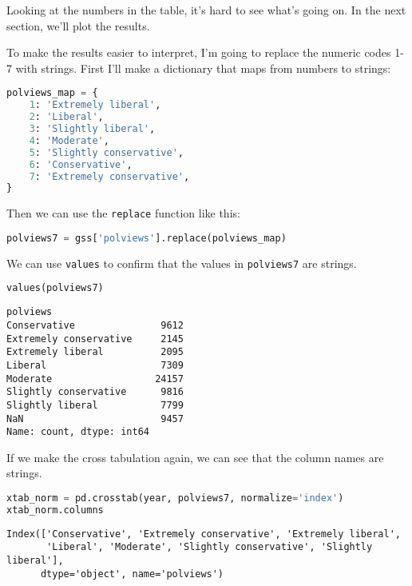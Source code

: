 Looking at the numbers in the table, it's hard to see what's going on.
In the next section, we'll plot the results.

To make the results easier to interpret, I'm going to replace the
numeric codes 1-7 with strings. First I'll make a dictionary that maps
from numbers to strings:

\begin{lstlisting}[language=Python,style=source]
polviews_map = {
    1: 'Extremely liberal',
    2: 'Liberal',
    3: 'Slightly liberal',
    4: 'Moderate',
    5: 'Slightly conservative',
    6: 'Conservative',
    7: 'Extremely conservative',
}
\end{lstlisting}

Then we can use the \passthrough{\lstinline!replace!} function like
this:

\begin{lstlisting}[language=Python,style=source]
polviews7 = gss['polviews'].replace(polviews_map)
\end{lstlisting}

We can use \passthrough{\lstinline!values!} to confirm that the values
in \passthrough{\lstinline!polviews7!} are strings.

\begin{lstlisting}[language=Python,style=source]
values(polviews7)
\end{lstlisting}

\begin{lstlisting}[style=output]
polviews
Conservative               9612
Extremely conservative     2145
Extremely liberal          2095
Liberal                    7309
Moderate                  24157
Slightly conservative      9816
Slightly liberal           7799
NaN                        9457
Name: count, dtype: int64
\end{lstlisting}

If we make the cross tabulation again, we can see that the column names
are strings.

\begin{lstlisting}[language=Python,style=source]
xtab_norm = pd.crosstab(year, polviews7, normalize='index')
xtab_norm.columns
\end{lstlisting}

\begin{lstlisting}[style=output]
Index(['Conservative', 'Extremely conservative', 'Extremely liberal',
       'Liberal', 'Moderate', 'Slightly conservative', 'Slightly liberal'],
      dtype='object', name='polviews')
\end{lstlisting}

